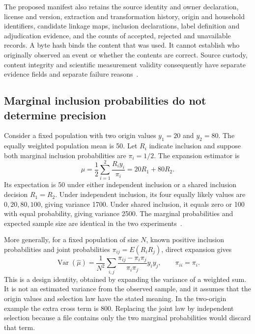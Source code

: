 The proposed manifest also retains the source identity and owner declaration,
license and version, extraction and transformation history, origin and
household identifiers, candidate linkage maps, inclusion declarations,
label definition and adjudication evidence, and the counts of accepted,
rejected and unavailable records. A byte hash binds the content that was
used. It cannot establish who originally observed an event or whether the
contents are correct. Source custody, content integrity and scientific
measurement validity consequently have separate evidence fields and separate
failure reasons~\citep{exec13_observation_design}.

\subsection{Marginal inclusion probabilities do not determine precision}

Consider a fixed population with two origin values $y_1=20$ and $y_2=80$.
The equally weighted population mean is 50. Let $R_i$ indicate inclusion
and suppose both marginal inclusion probabilities are $\pi_i=1/2$. The
expansion estimator is
\[
 \widehat\mu=\frac12\sum_{i=1}^2\frac{R_i y_i}{\pi_i}
             =20R_1+80R_2.
\]
Its expectation is 50 under either independent inclusion or a shared
inclusion decision $R_1=R_2$. Under independent inclusion, its four equally
likely values are $0,20,80,100$, giving variance 1700. Under shared inclusion,
it equals zero or 100 with equal probability, giving variance 2500.
The marginal probabilities and expected sample size are identical in the
two experiments~\citep{exec13_observation_exact}.

More generally, for a fixed population of size $N$, known positive
inclusion probabilities and joint probabilities
$\pi_{ij}=E(R_iR_j)$, direct expansion gives
\begin{equation}
 \operatorname{Var}(\widehat\mu)
 =\frac{1}{N^2}\sum_{i,j}
   \frac{\pi_{ij}-\pi_i\pi_j}{\pi_i\pi_j}y_i y_j,
 \qquad \pi_{ii}=\pi_i.
 \label{exec13:observation-inclusion-variance}
\end{equation}
This is a design identity, obtained by expanding the variance of a weighted
sum. It is not an estimated variance from the observed sample, and it assumes
that the origin values and selection law have the stated meaning. In the
two-origin example the extra cross term is 800. Replacing the joint law
by independent selection because a file contains only the two marginal
probabilities would discard that term.

